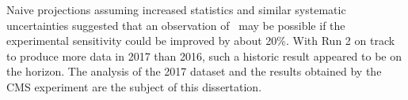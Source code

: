 Naive projections assuming increased statistics and similar systematic uncertainties suggested that an observation of \VHbb\ may be possible if the experimental sensitivity could be improved by about 20\%. With Run 2 on track to produce more data in 2017 than 2016, such a historic result appeared to be on the horizon. The analysis of the 2017 dataset and the results obtained by the CMS experiment are the subject of this dissertation.
